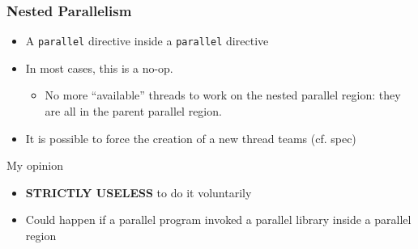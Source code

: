 \documentclass{beamer}
\begin{document}
\begin{frame}
  \frametitle{Nested Parallelism}


  \begin{itemize}
\item A \texttt{parallel} directive inside a \texttt{parallel} directive

\medskip
  
\item In most cases, this is a no-op.
  \begin{itemize}
  \item No more ``available'' threads to work on the nested parallel region:
    they are all in the parent parallel region.
  \end{itemize}

  \medskip

\item It is possible to force the creation of a new thread teams (cf. spec)
  
\end{itemize}

\begin{alertblock}{My opinion}
  \begin{itemize}
  \item \textbf{STRICTLY USELESS} to do it voluntarily
  \item Could happen if a parallel program invoked a parallel library inside a parallel region
  \end{itemize}
\end{alertblock}
\end{frame}




  
  
\end{document}
